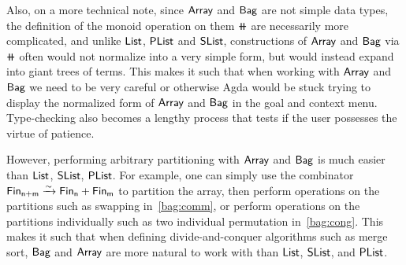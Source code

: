 Also, on a more technical note, since $\operatorname{\mathsf{Array}}$ and $\operatorname{\mathsf{Bag}}$ are not simple data types, the definition of
the monoid operation on them $\doubleplus$ are necessarily more complicated, and unlike $\operatorname{\mathsf{List}}$, $\operatorname{\mathsf{PList}}$
and $\operatorname{\mathsf{SList}}$, constructions of $\operatorname{\mathsf{Array}}$ and $\operatorname{\mathsf{Bag}}$ via $\doubleplus$ often would not normalize into a
very simple form, but would instead expand into giant trees of terms. This makes it such that when working
with $\operatorname{\mathsf{Array}}$ and $\operatorname{\mathsf{Bag}}$ we need to be very careful or otherwise Agda would be stuck trying to display
the normalized form of $\operatorname{\mathsf{Array}}$ and $\operatorname{\mathsf{Bag}}$ in the goal and context menu. Type-checking also becomes a lengthy
process that tests if the user possesses the virtue of patience.

However, performing arbitrary partitioning with $\operatorname{\mathsf{Array}}$ and $\operatorname{\mathsf{Bag}}$ is much easier than
$\operatorname{\mathsf{List}}$, $\operatorname{\mathsf{SList}}$, $\operatorname{\mathsf{PList}}$. For example,
one can simply use the combinator $\Fin[n+m] \xto{\sim} \Fin[n] + \Fin[m]$ to partition the array,
then perform operations on the partitions such as swapping in~\cref{bag:comm},
or perform operations on the partitions individually such as two individual permutation in~\cref{bag:cong}.
This makes it such that when defining divide-and-conquer algorithms such as merge sort,
$\operatorname{\mathsf{Bag}}$ and $\operatorname{\mathsf{Array}}$ are more natural to work with than $\operatorname{\mathsf{List}}$, $\operatorname{\mathsf{SList}}$, and $\operatorname{\mathsf{PList}}$.
